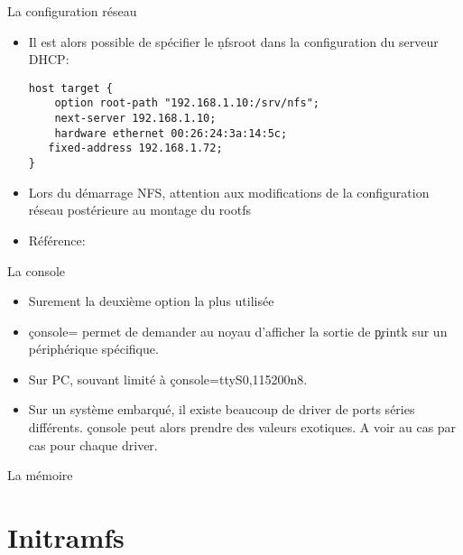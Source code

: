 \begin{frame}[fragile=singleslide]{La configuration réseau}
  \begin{itemize} 
  \item  Il est  alors possible  de spécifier  le \c{nfsroot}  dans la
    configuration du serveur DHCP:
     \begin{lstlisting} 
host target {
    option root-path "192.168.1.10:/srv/nfs";
    next-server 192.168.1.10;
    hardware ethernet 00:26:24:3a:14:5c;
   fixed-address 192.168.1.72;
}
     \end{lstlisting} 
   \item  Lors du  démarrage NFS,  attention aux  modifications  de la
     configuration réseau postérieure au montage du rootfs
    \item Référence: 
  \end{itemize} 
\end{frame} 

\begin{frame}[fragile=singleslide]{La console}
  \begin{itemize} 
    \item Surement la deuxième option la plus utilisée
    \item  \c{console=}  permet de  demander  au  noyau d'afficher  la
      sortie de \c{printk} sur un périphérique spécifique.
    \item Sur PC, souvant limité à \c{console=ttyS0,115200n8}.
    \item Sur  un système  embarqué, il existe  beaucoup de  driver de
      ports  séries différents.   \c{console} peut  alors  prendre des
      valeurs exotiques. A voir au cas par cas pour chaque driver.
  \end{itemize} 
\end{frame} 

\begin{frame}[fragile=singleslide]{La mémoire}
\end{frame} 


\section{Initramfs}

